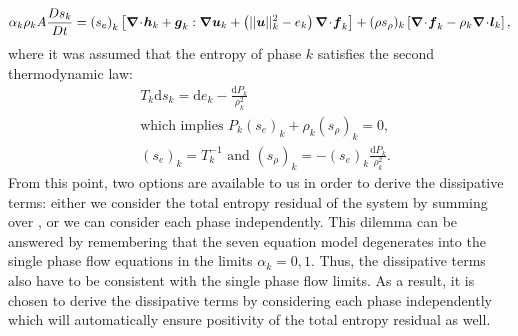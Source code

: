 %
\begin{equation}\label{eq:ent-res-7-eqn-diss-terms}
\alpha_k \rho_k A \frac{Ds_k}{Dt} = \left(s_e\right)_k \left[ \div \mbold h_k + \mbold g_k : \grad \mbold u_k +  \left( || \mbold u ||^2_k - e_k\right) \div \mbold f_k  \right] + (\rho s_\rho)_k \left[ \div \mbold f_k - \rho_k \div \mbold l_k \right],
\end{equation}
%
where it was assumed that the entropy of phase $k$ satisfies the second thermodynamic law: 
%
\begin{align}\label{eq:2nd-therm-laws-sect4}
&T_k \text{d} s_k = \text{d}e_k - \frac{\text{d}P_k}{\rho_k^2} \nonumber \\
& \text{which implies } P_k (s_e)_k + \rho_k (s_\rho)_k = 0, \\
& (s_e)_k = T_k^{-1} \text{ and } (s_\rho)_k = - (s_e)_k \frac{\text{d}P_k}{\rho_k^2}. \nonumber
\end{align}
% 
From this point, two options are available to us in order to derive the dissipative terms: either we consider the total entropy residual of the system by summing over , or we can consider each phase independently. This dilemma can be answered by remembering that the seven equation model degenerates into the single phase flow equations in the limits $\alpha_k = 0,1$. Thus, the dissipative terms also have to be consistent with the single phase flow limits. As a result, it is chosen to derive the dissipative terms by considering each phase independently which will automatically ensure positivity of the total entropy residual as well.

